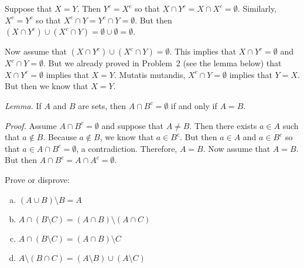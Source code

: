 \documentclass[11pt,letterpaper]{article}
\begin{document}
\sol Suppose that $X= Y$. Then $Y^c= X^c$ so that $X \cap Y^c= X \cap X^c= \emptyset$. Similarly, $X^c= Y^c$ so that $X^c \cap Y= Y^c \cap Y= \emptyset$. But then $(X \cap Y^c) \cup (X^c \cap Y)= \emptyset \cup \emptyset= \emptyset$. 

Now assume that $(X \cap Y^c) \cup (X^c \cap Y)= \emptyset$. This implies that $X \cap Y^c= \emptyset$ and $X^c \cap Y= \emptyset$. But we already proved in Problem~2 (see the lemma below) that $X \cap Y^c= \emptyset$ implies that $X= Y$. Mutatis mutandis, $X^c \cap Y= \emptyset$ implies that $Y= X$. But then we know that $X= Y$. 

\vfill

{\noindent\itshape Lemma.} If $A$ and $B$ are sets, then $A \cap B^c= \emptyset$ if and only if $A= B$. 

{\noindent\itshape Proof.} Assume $A \cap B^c= \emptyset$ and suppose that $A \neq B$. Then there exists $a \in A$ such that $a \notin B$. Because $a \notin B$, we know that $a \in B^c$. But then $a \in A$ and $a \in B^c$ so that $a \in A \cap B^c= \emptyset$, a contradiction. Therefore, $A= B$. Now assume that $A= B$. But then $A \cap B^c= A \cap A^c= \emptyset$.





\newpage





 Prove or disprove:
	\begin{enumerate}[(a)]
	\item $(A \cup B) \setminus B= A$
	\item $A \cap (B \setminus C)= (A \cap B) \setminus (A \cap C)$
	\item $A \cap (B \setminus C)= (A \cap B) \setminus C$
	\item $A \setminus (B \cap C)= (A \setminus B) \cup (A \setminus C)$
	\end{enumerate} 
\end{document}
